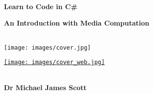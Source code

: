 
\thispagestyle{empty}


\vspace{3cm}
  \begin{center}
	\bfseries \sffamily \Huge Learn to Code in C\# \par
	\bfseries \LARGE An Introduction with Media Computation \par
~\\
	
    \ifpdf
		\texttt{[image: images/cover.jpg]}

	\else
		\href{learn2codech1.html}{\texttt{[image: images/cover\_web.jpg]}}
    \fi
    
	~\\
	\bfseries \small Dr Michael James Scott\par
  \end{center}

\newpage